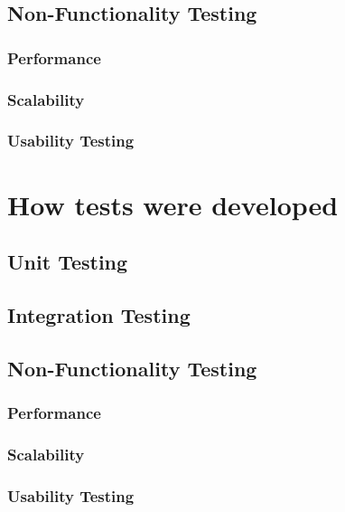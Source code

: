 \documentclass[12pt]{article}
\begin{document}
		\subsection{Non-Functionality Testing}
		
			\subsubsection{Performance}
			
			\subsubsection{Scalability}
			
			\subsubsection{Usability Testing}
		
	\section{How tests were developed}
		
		\subsection{Unit Testing}
		
		\subsection{Integration Testing}
			
		\subsection{Non-Functionality Testing}
			
			\subsubsection{Performance}
						
			\subsubsection{Scalability}
						
			\subsubsection{Usability Testing}
		
\end{document}
